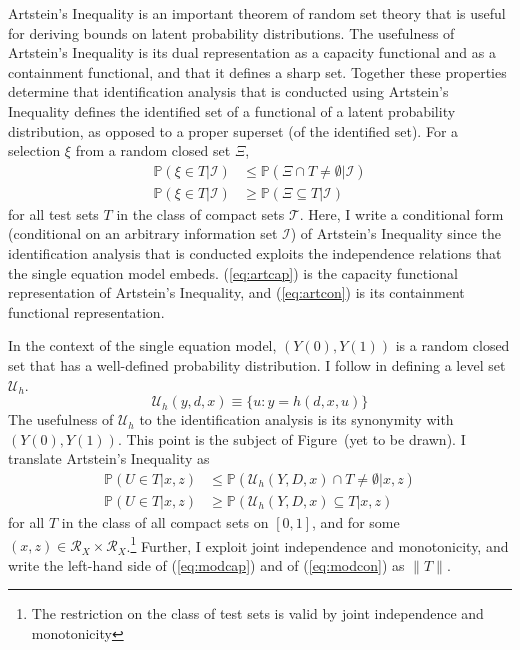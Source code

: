 \documentclass[10pt,a4paper,twoside]{article}
\numberwithin{equation}{section}
\newcommand{\Art}{Artstein's Inequality}
\begin{document}
{\Art} \citep{aR83} is an important theorem of random set theory that is useful for deriving bounds on latent probability distributions. The usefulness of {\Art} is its dual representation as a capacity functional and as a containment functional, and that it defines a sharp set. Together these properties determine that identification analysis that is conducted using {\Art} defines the identified set of a functional of a latent probability distribution, as opposed to a proper superset (of the identified set). For a selection $\xi$ from a random closed set $\Xi$,
\begin{align}
\mathbb{P}(\xi\in T|\mathcal{I})&\leq\mathbb{P}(\Xi\cap T\neq\emptyset|\mathcal{I})\label{eq:artcap}\\
\mathbb{P}(\xi\in T|\mathcal{I})&\geq\mathbb{P}(\Xi\subseteq T|\mathcal{I})\label{eq:artcon}
\end{align}
for all test sets $T$ in the class of compact sets $\mathcal{T}$. Here, I write a conditional form (conditional on an arbitrary information set $\mathcal{I}$) of {\Art} since the identification analysis that is conducted exploits the independence relations that the single equation model embeds. (\ref{eq:artcap}) is the capacity functional representation of {\Art}, and (\ref{eq:artcon}) is its containment functional representation. 

In the context of the single equation model, $(Y(0),Y(1))$ is a random closed set that has a well-defined probability distribution. I follow \cite{cr13} in defining a level set $\mathcal{U}_h$.
\[\mathcal{U}_h(y,d,x)\equiv\lbrace u : y=h(d,x,u)\rbrace\] 
The usefulness of $\mathcal{U}_h$ to the identification analysis is its synonymity with $(Y(0),Y(1))$. This point is the subject of Figure~(\color{red}yet to be drawn\color{black}). I translate {\Art} as 
\begin{align}
\mathbb{P}(U\in T|x,z)&\leq\mathbb{P}(\mathcal{U}_h(Y,D,x)\cap T\neq\emptyset|x,z)\label{eq:modcap}\\
\mathbb{P}(U\in T|x,z)&\geq\mathbb{P}(\mathcal{U}_h(Y,D,x)\subseteq T|x,z)\label{eq:modcon}
\end{align}
for all $T$ in the class of all compact sets on $[0,1]$, and for some $(x,z)\in\mathcal{R}_X\times\mathcal{R}_X$.\footnote{The restriction on the class of test sets is valid by joint independence and monotonicity} Further, I exploit joint independence and monotonicity, and write the left-hand side of (\ref{eq:modcap}) and of (\ref{eq:modcon}) as $\| T\|$. 
\end{document}
